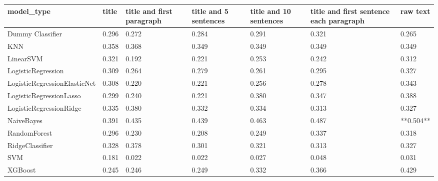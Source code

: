 \begin{tabular}{lllllll}
\toprule
                  model\_type & title & title and first paragraph & title and 5 sentences & title and 10 sentences & title and first sentence each paragraph &  raw text \\
\midrule
            Dummy Classifier & 0.296 &                     0.272 &                 0.284 &                  0.291 &                                   0.321 &     0.265 \\
                         KNN & 0.358 &                     0.368 &                 0.349 &                  0.349 &                                   0.349 &     0.349 \\
                   LinearSVM & 0.321 &                     0.192 &                 0.221 &                  0.253 &                                   0.242 &     0.312 \\
          LogisticRegression & 0.309 &                     0.264 &                 0.279 &                  0.261 &                                   0.295 &     0.327 \\
LogisticRegressionElasticNet & 0.308 &                     0.220 &                 0.221 &                  0.256 &                                   0.278 &     0.343 \\
     LogisticRegressionLasso & 0.299 &                     0.240 &                 0.221 &                  0.380 &                                   0.347 &     0.388 \\
     LogisticRegressionRidge & 0.335 &                     0.380 &                 0.332 &                  0.334 &                                   0.313 &     0.327 \\
                  NaiveBayes & 0.391 &                     0.435 &                 0.439 &                  0.463 &                                   0.487 & **0.504** \\
                RandomForest & 0.296 &                     0.230 &                 0.208 &                  0.249 &                                   0.337 &     0.318 \\
             RidgeClassifier & 0.328 &                     0.378 &                 0.301 &                  0.321 &                                   0.313 &     0.327 \\
                         SVM & 0.181 &                     0.022 &                 0.022 &                  0.027 &                                   0.048 &     0.031 \\
                     XGBoost & 0.245 &                     0.246 &                 0.249 &                  0.332 &                                   0.366 &     0.429 \\
\bottomrule
\end{tabular}
